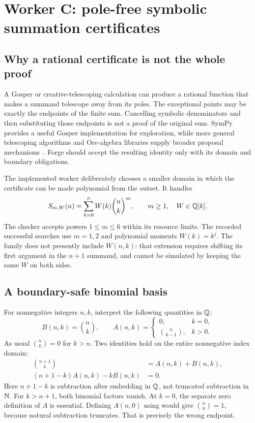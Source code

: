\section{Worker C: pole-free symbolic summation certificates}
\label{sec:sum}

\subsection{Why a rational certificate is not the whole proof}

A Gosper or creative-telescoping calculation can produce a rational function
that makes a summand telescope away from its poles. The exceptional points may
be exactly the endpoints of the finite sum. Cancelling symbolic denominators
and then substituting those endpoints is not a proof of the original sum.
SymPy provides a useful Gosper implementation for exploration, while more
general telescoping algorithms and Ore-algebra libraries supply broader
proposal mechanisms~\cite{sympy-concrete,brochet-salvy,ore-algebra}. Forge should
accept the resulting identity only with its domain and boundary obligations.

The implemented worker deliberately chooses a smaller domain in which the
certificate can be made polynomial from the outset. It handles
\begin{equation}\label{eq:sum-family}
 S_{m,W}(n)=\sum_{k=0}^{n}W(k)\binom nk^m,
 \qquad m\ge1,\quad W\in\mathbb Q[k].
\end{equation}
The checker accepts powers $1\le m\le6$ within its resource limits. The recorded
successful searches use $m=1,2$ and polynomial moments $W(k)=k^j$.
The family does not presently include $W(n,k)$: that extension requires shifting
its first argument in the $n+1$ summand, and cannot be simulated by keeping the
same $W$ on both sides.

\subsection{A boundary-safe binomial basis}

For nonnegative integers $n,k$, interpret the following quantities in $\mathbb Q$:
\[
 B(n,k)=\binom nk,
 \qquad
 A(n,k)=
 \begin{cases}0,&k=0,\\\binom n{k-1},&k>0.
 \end{cases}
\]
As usual $\binom nk=0$ for $k>n$. Two identities hold on the entire nonnegative
index domain:
\begin{align}
 \binom{n+1}{k}&=A(n,k)+B(n,k),\label{eq:pascal-safe}\\
 (n+1-k)A(n,k)-kB(n,k)&=0.\label{eq:cross-safe}
\end{align}
Here $n+1-k$ is subtraction after embedding in $\mathbb Q$, not truncated subtraction
in $\mathbb N$. For $k>n+1$, both binomial factors vanish. At $k=0$, the separate
zero definition of $A$ is essential. Defining $A(n,0)$ using
 would give $\binom n0=1$, because natural
subtraction truncates. That is precisely the wrong endpoint.

